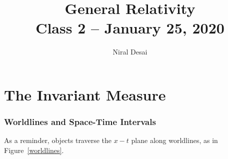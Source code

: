 \documentclass[11pt]{article}
\title{{\Huge General Relativity}\\{\Large{Class 2 -- January 25, 2020}}} %
\author{Niral Desai}
\begin{document}
	\maketitle
	\flushbottom
	\newpage
	\pagestyle{fancynotes}
	\part{The Invariant Measure}
	\section{Worldlines and Space-Time Intervals}
	As a reminder, objects traverse the $x-t$ plane along worldlines, as in Figure~\ref{worldlines}.
	
\end{document}
